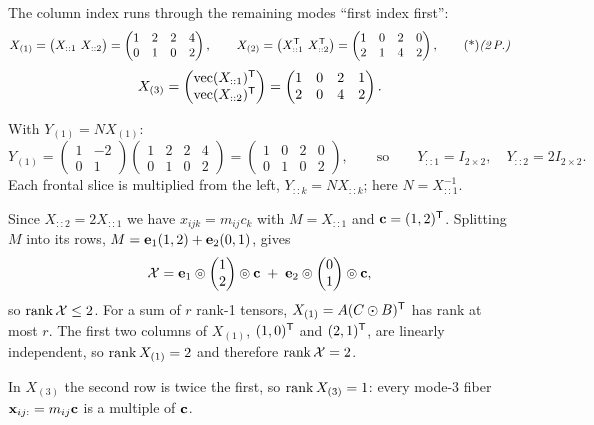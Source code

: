 \begin{solution}
 The column index runs through the remaining modes ``first index first'':
\[
X_{(1)}=\big(X_{::1}\ X_{::2}\big)=\begin{pmatrix}1&2&2&4\\0&1&0&2\end{pmatrix},\qquad
X_{(2)}=\big(X_{::1}\T\ X_{::2}\T\big)=\begin{pmatrix}1&0&2&0\\2&1&4&2\end{pmatrix},\ptd{2}
\]
\[
X_{(3)}=\begin{pmatrix}\operatorname{vec}(X_{::1})^{\mathsf{T}}\\ \operatorname{vec}(X_{::2})^{\mathsf{T}}\end{pmatrix}=\begin{pmatrix}1&0&2&1\\2&0&4&2\end{pmatrix}.
\]

 With $Y_{(1)}=NX_{(1)}$:
\[
Y_{(1)}=\begin{pmatrix}1&-2\\0&1\end{pmatrix}\begin{pmatrix}1&2&2&4\\0&1&0&2\end{pmatrix}=\begin{pmatrix}1&0&2&0\\0&1&0&2\end{pmatrix},
\qquad\text{so}\qquad Y_{::1}=I_{2\times2},\quad Y_{::2}=2I_{2\times2}.
\]
Each frontal slice is multiplied from the left, $Y_{::k}=NX_{::k}$; here $N=X_{::1}^{-1}$. 

 Since $X_{::2}=2X_{::1}$ we have $x_{ijk}=m_{ij}c_k$ with $M=X_{::1}$ and $\mathbf{c}=(1,2)^{\mathsf{T}}$. Splitting $M$ into its rows, $M=\mathbf{e}_1(1,2)+\mathbf{e}_2(0,1)$, gives
\[
\mathcal{X}=\mathbf{e}_1\circledcirc\begin{pmatrix}1\\2\end{pmatrix}\circledcirc\mathbf{c}\;+\;\mathbf{e}_2\circledcirc\begin{pmatrix}0\\1\end{pmatrix}\circledcirc\mathbf{c},
\]
so $\operatorname{rank}\mathcal{X}\le2$. 
For a sum of $r$ rank-1 tensors, $X_{(1)}=A(C\odot B)^{\mathsf{T}}$ has rank at most $r$. The first two columns of $X_{(1)}$, $(1,0)^{\mathsf{T}}$ and $(2,1)^{\mathsf{T}}$, are linearly independent, so $\operatorname{rank} X_{(1)}=2$ and therefore $\operatorname{rank}\mathcal{X}=2$. 

 In $X_{(3)}$ the second row is twice the first, so $\operatorname{rank} X_{(3)}=1$: every mode-3 fiber $\mathbf{x}_{ij:}=m_{ij}\mathbf{c}$ is a multiple of $\mathbf{c}$. 


\end{solution}
